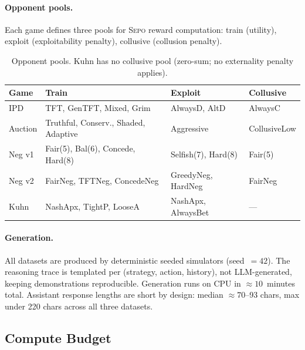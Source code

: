 \documentclass[letterpaper]{article} %
\newcommand{\sepo}{\textsc{Sepo}}
\begin{document}
\paragraph{Opponent pools.} Each game defines three pools for \sepo{} reward computation: train (utility), exploit (exploitability penalty), collusive (collusion penalty).
\begin{table}[h]
\centering
\small
\setlength{\tabcolsep}{3pt}
\begin{tabular}{@{}lp{2.0cm}p{1.8cm}p{1.6cm}@{}}
\toprule
\textbf{Game} & \textbf{Train} & \textbf{Exploit} & \textbf{Collusive} \\
\midrule
IPD     & TFT, GenTFT, Mixed, Grim & AlwaysD, AltD & AlwaysC \\
Auction & Truthful, Conserv., Shaded, Adaptive & Aggressive & CollusiveLow \\
Neg v1  & Fair(5), Bal(6), Concede, Hard(8) & Selfish(7), Hard(8) & Fair(5) \\
Neg v2  & FairNeg, TFTNeg, ConcedeNeg & GreedyNeg, HardNeg & FairNeg \\
Kuhn    & NashApx, TightP, LooseA & NashApx, AlwaysBet & --- \\
\bottomrule
\end{tabular}
\caption{Opponent pools. Kuhn has no collusive pool (zero-sum; no externality penalty applies).}
\label{tab:opponent-pools}
\end{table}
\paragraph{Generation.} All datasets are produced by deterministic seeded simulators (seed~$=42$). The reasoning trace is templated per (strategy, action, history), not LLM-generated, keeping demonstrations reproducible. Generation runs on CPU in $\approx 10$~minutes total. Assistant response lengths are short by design: median $\approx 70$--93 chars, max under 220 chars across all three datasets.
\subsection{Compute Budget}
\label{app:compute}
\end{document}
